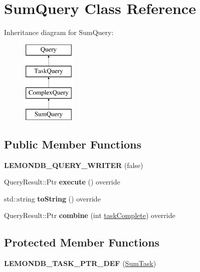 \hypertarget{class_sum_query}{}\section{Sum\+Query Class Reference}
\label{class_sum_query}
Inheritance diagram for Sum\+Query\+:\begin{figure}[H]
\begin{center}
\leavevmode
\includegraphics[height=4.000000cm]{class_sum_query}
\end{center}
\end{figure}
\subsection*{Public Member Functions}
\begin{DoxyCompactItemize}
\item 
\mbox{\label{class_sum_query_a9103b3e0edd89aaf08c87d765e07c69c}} 
{\bfseries L\+E\+M\+O\+N\+D\+B\+\_\+\+Q\+U\+E\+R\+Y\+\_\+\+W\+R\+I\+T\+ER} (false)
\item 
\mbox{\label{class_sum_query_ae2b88c927e0d13a155863004e69185ad}} 
Query\+Result\+::\+Ptr {\bfseries execute} () override
\item 
\mbox{\label{class_sum_query_aa25cd7593520f1da60b6acfad4db5849}} 
std\+::string {\bfseries to\+String} () override
\item 
\mbox{\label{class_sum_query_ac63c708b0d6a62f7124785ad041472f8}} 
Query\+Result\+::\+Ptr {\bfseries combine} (int \hyperlink{class_task_query_a3dc3e4c56ddea8ff025239fd9da358d3}{task\+Complete}) override
\end{DoxyCompactItemize}
\subsection*{Protected Member Functions}
\begin{DoxyCompactItemize}
\item 
\mbox{\label{class_sum_query_a0db4bf7e9e2ae9a616891bcb07586344}} 
{\bfseries L\+E\+M\+O\+N\+D\+B\+\_\+\+T\+A\+S\+K\+\_\+\+P\+T\+R\+\_\+\+D\+EF} (\hyperlink{class_sum_task}{Sum\+Task})
\end{DoxyCompactItemize}
